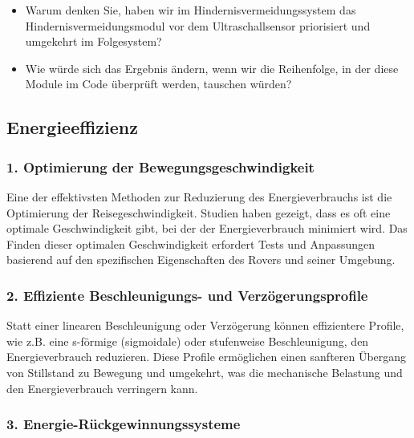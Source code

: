 \documentclass{vorlage-design-main}
\begin{document}
\begin{itemize}
\item
  Warum denken Sie, haben wir im Hindernisvermeidungssystem das
  Hindernisvermeidungsmodul vor dem Ultraschallsensor priorisiert und
  umgekehrt im Folgesystem?
\item
  Wie würde sich das Ergebnis ändern, wenn wir die Reihenfolge, in der
  diese Module im Code überprüft werden, tauschen würden?
\end{itemize}

\hypertarget{energieeffizienz}{%
\subsection{Energieeffizienz}\label{energieeffizienz}}

\hypertarget{optimierung-der-bewegungsgeschwindigkeit}{%
\subsubsection{\texorpdfstring{1. \textbf{Optimierung der
Bewegungsgeschwindigkeit}}{1. Optimierung der Bewegungsgeschwindigkeit}}\label{optimierung-der-bewegungsgeschwindigkeit}}

Eine der effektivsten Methoden zur Reduzierung des Energieverbrauchs ist
die Optimierung der Reisegeschwindigkeit. Studien haben gezeigt, dass es
oft eine optimale Geschwindigkeit gibt, bei der der Energieverbrauch
minimiert wird. Das Finden dieser optimalen Geschwindigkeit erfordert
Tests und Anpassungen basierend auf den spezifischen Eigenschaften des
Rovers und seiner Umgebung.

\hypertarget{effiziente-beschleunigungs--und-verzuxf6gerungsprofile}{%
\subsubsection{\texorpdfstring{2. \textbf{Effiziente Beschleunigungs-
und
Verzögerungsprofile}}{2. Effiziente Beschleunigungs- und Verzögerungsprofile}}\label{effiziente-beschleunigungs--und-verzoegerungsprofile}}

Statt einer linearen Beschleunigung oder Verzögerung können effizientere
Profile, wie z.B. eine s-förmige (sigmoidale) oder stufenweise
Beschleunigung, den Energieverbrauch reduzieren. Diese Profile
ermöglichen einen sanfteren Übergang von Stillstand zu Bewegung und
umgekehrt, was die mechanische Belastung und den Energieverbrauch
verringern kann.

\hypertarget{energie-ruxfcckgewinnungssysteme}{%
\subsubsection{\texorpdfstring{3.
\textbf{Energie-Rückgewinnungssysteme}}{3. Energie-Rückgewinnungssysteme}}\label{energie-rueckgewinnungssysteme}}
\end{document}
